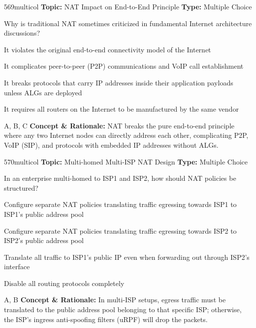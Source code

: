 \begin{qcard}{569}{multicol}
\textcolor{darkslate!75}{\small\textbf{Topic:} NAT Impact on End-to-End Principle \hfill \textbf{Type:} Multiple Choice}\vspace{0.4em}\par
Why is traditional NAT sometimes criticized in fundamental Internet architecture discussions?
\begin{qoptions}
\item It violates the original end-to-end connectivity model of the Internet
\item It complicates peer-to-peer (P2P) communications and VoIP call establishment
\item It breaks protocols that carry IP addresses inside their application payloads unless ALGs are deployed
\item It requires all routers on the Internet to be manufactured by the same vendor
\end{qoptions}
\end{qcard}
\nopagebreak
\begin{explainbox}{A, B, C}
\textbf{Concept \& Rationale:} NAT breaks the pure end-to-end principle where any two Internet nodes can directly address each other, complicating P2P, VoIP (SIP), and protocols with embedded IP addresses without ALGs.
\end{explainbox}

\begin{qcard}{570}{multicol}
\textcolor{darkslate!75}{\small\textbf{Topic:} Multi-homed Multi-ISP NAT Design \hfill \textbf{Type:} Multiple Choice}\vspace{0.4em}\par
In an enterprise multi-homed to ISP1 and ISP2, how should NAT policies be structured?
\begin{qoptions}
\item Configure separate NAT policies translating traffic egressing towards ISP1 to ISP1's public address pool
\item Configure separate NAT policies translating traffic egressing towards ISP2 to ISP2's public address pool
\item Translate all traffic to ISP1's public IP even when forwarding out through ISP2's interface
\item Disable all routing protocols completely
\end{qoptions}
\end{qcard}
\nopagebreak
\begin{explainbox}{A, B}
\textbf{Concept \& Rationale:} In multi-ISP setups, egress traffic must be translated to the public address pool belonging to that specific ISP; otherwise, the ISP's ingress anti-spoofing filters (uRPF) will drop the packets.
\end{explainbox}

